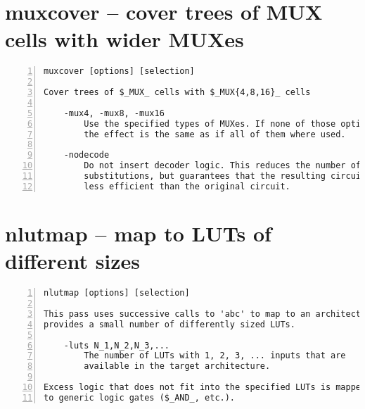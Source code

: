 \section{muxcover -- cover trees of MUX cells with wider MUXes}
\label{cmd:muxcover}
\begin{lstlisting}[numbers=left,frame=single]
    muxcover [options] [selection]

Cover trees of $_MUX_ cells with $_MUX{4,8,16}_ cells

    -mux4, -mux8, -mux16
        Use the specified types of MUXes. If none of those options are used,
        the effect is the same as if all of them where used.

    -nodecode
        Do not insert decoder logic. This reduces the number of possible
        substitutions, but guarantees that the resulting circuit is not
        less efficient than the original circuit.
\end{lstlisting}

\section{nlutmap -- map to LUTs of different sizes}
\label{cmd:nlutmap}
\begin{lstlisting}[numbers=left,frame=single]
    nlutmap [options] [selection]

This pass uses successive calls to 'abc' to map to an architecture. That
provides a small number of differently sized LUTs.

    -luts N_1,N_2,N_3,...
        The number of LUTs with 1, 2, 3, ... inputs that are
        available in the target architecture.

Excess logic that does not fit into the specified LUTs is mapped back
to generic logic gates ($_AND_, etc.).
\end{lstlisting}

